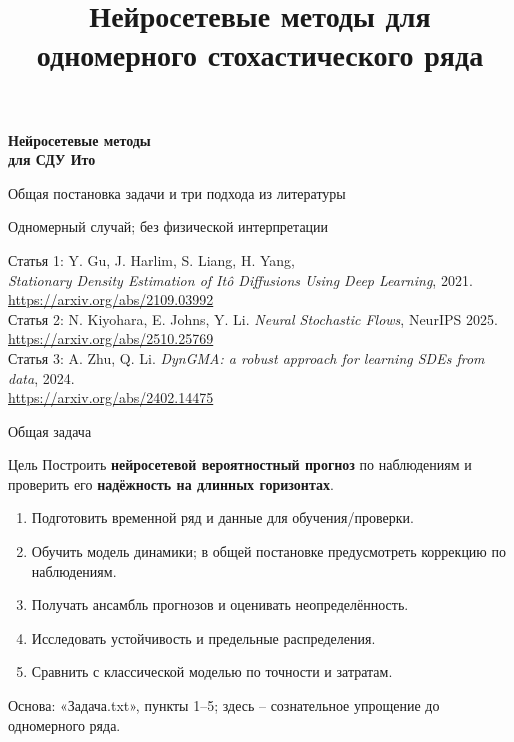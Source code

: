 \documentclass[10pt,aspectratio=169]{beamer}
\title[Нейросетевые методы для стохастического ряда]{Нейросетевые методы для одномерного стохастического ряда}
\begin{document}
\begin{frame}[plain]
\vspace{1cm}{\color{teal}\rule{1.9cm}{2.5pt}}\par\vspace{0.6cm}
{\huge\bfseries Нейросетевые методы\\[0.2cm] для СДУ Ито}\par\vspace{0.5cm}
{\large Общая постановка задачи и три подхода из литературы}\par\vspace{0.5cm}
{\color{graytext}Одномерный случай; без физической интерпретации}\par\vfill
{\footnotesize\color{graytext}Статья 1: Y. Gu, J. Harlim, S. Liang, H. Yang,\\
\textit{Stationary Density Estimation of It\^o Diffusions Using Deep Learning}, 2021.\\
\textcolor{blue}{\url{https://arxiv.org/abs/2109.03992}}}\\[0.08cm]
{\footnotesize\color{graytext}Статья 2: N. Kiyohara, E. Johns, Y. Li. \textit{Neural Stochastic Flows}, NeurIPS 2025.\\
\textcolor{blue}{\url{https://arxiv.org/abs/2510.25769}}}\\[0.08cm]
{\footnotesize\color{graytext}Статья 3: A. Zhu, Q. Li. \textit{DynGMA: a robust approach for learning SDEs from data}, 2024.\\
\textcolor{blue}{\url{https://arxiv.org/abs/2402.14475}}}\vspace{0.18cm}
\end{frame}

\begin{frame}{Общая задача}
\vspace{0.15cm}
\begin{block}{Цель}
Построить \textbf{нейросетевой вероятностный прогноз} по наблюдениям и проверить его \textbf{надёжность на длинных горизонтах}.
\end{block}
\vspace{0.17cm}
\begin{enumerate}\setlength\itemsep{0.21cm}
\item Подготовить временной ряд и данные для обучения/проверки.
\item Обучить модель динамики; в общей постановке предусмотреть коррекцию по наблюдениям.
\item Получать ансамбль прогнозов и оценивать неопределённость.
\item Исследовать устойчивость и предельные распределения.
\item Сравнить с классической моделью по точности и затратам.
\end{enumerate}
\vfill{\tiny\color{graytext}Основа: «Задача.txt», пункты 1--5; здесь -- сознательное упрощение до одномерного ряда.}
\end{frame}
\end{document}
